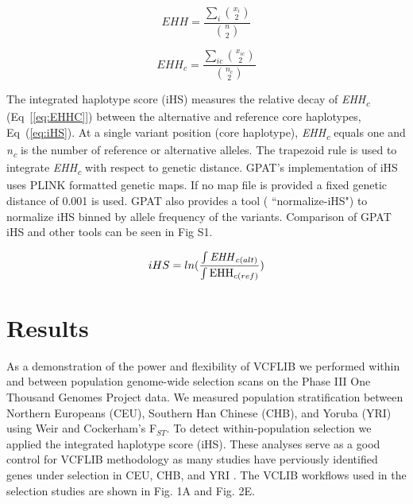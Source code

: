\documentclass[10pt,letterpaper]{article}
\begin{document}
\begin{equation}\label{eq:EHH} 
EHH=\frac{\sum_{i} \binom{x_i}{2}}{\binom{n}{2}}
\end{equation}

\begin{equation}\label{eq:EHHC} 
EHH_c=\frac{\sum_{ic} \binom{x_{ic}}{2}}{\binom{n_c}{2}}
\end{equation}

The integrated haplotype score (iHS) measures the relative decay of \textit{EHH\textsubscript{c}} (Eq~[\ref{eq:EHHC}]) between the alternative and reference core haplotypes,  Eq~(\ref{eq:iHS})\cite{voight}.  At a single variant position (core haplotype), \textit{EHH\textsubscript{c}} equals one and \textit{n\textsubscript{c}} is the number of reference or alternative alleles.  The trapezoid rule is used to integrate  \textit{EHH\textsubscript{c}} with respect to genetic distance.  GPAT's implementation of iHS uses PLINK formatted genetic maps\cite{plink}.  If no map file is provided a fixed genetic distance of 0.001 is used.  GPAT also provides a tool ( ``normalize-iHS") to normalize iHS binned by allele frequency of the variants.  Comparison of GPAT iHS and other tools can be seen in Fig S1\cite{selscan}\cite{voight}.

\begin{equation}\label{eq:iHS} 
iHS = ln(\frac{\int \textrm{\textit{EHH}}_{c(alt)}}{ \int \textrm{EHH}_{c(ref)} } )
\end{equation}


\section*{Results}

As a demonstration of the power and flexibility of VCFLIB we performed within and between population genome-wide selection scans on the Phase III One Thousand Genomes Project data\cite{1kg}.  We measured population stratification between Northern Europeans (CEU), Southern Han Chinese (CHB), and Yoruba (YRI) using Weir and Cockerham's  F$_{ST}$. To detect within-population selection we applied the integrated haplotype score (iHS).  These analyses serve as a good control for VCFLIB methodology as many studies have perviously identified genes under selection in CEU, CHB, and YRI \cite{pickrell, sabeti, mathieson, weir}.  The VCLIB workflows used in the selection studies are shown in Fig. 1A and Fig. 2E.
\end{document}
